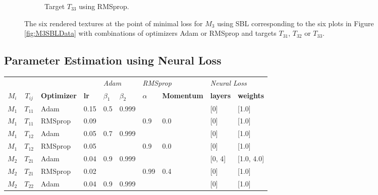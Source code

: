 \begin{figure}
\begin{subfigure}[t]{.25\textwidth}
    \caption{Target $T_{33}$ using RMSprop.}
    \label{fig:M3SBLFinalRendersRealLifeRMSprop}
\end{subfigure}
\caption{The six rendered textures at the point of minimal loss for $M_3$ using SBL corresponding to the six plots in Figure \ref{fig:M3SBLData} with combinations of optimizers Adam or RMSprop and targets $T_{31}$, $T_{32}$ or $T_{33}$.}
\label{fig:M3SBLFinalRenders}
\end{figure}

\newpage
\subsection{Parameter Estimation using Neural Loss}

\begin{table}
\centering
\begin{tabular}{ccllllllll}
\textbf{}      &                   & \textbf{}          & \multicolumn{1}{l|}{}            & \multicolumn{2}{l|}{\textit{Adam}}                           & \multicolumn{2}{l|}{\textit{RMSprop}}                      & \multicolumn{2}{l|}{\textit{Neural Loss}}               \\
\textbf{$M_i$} & \textbf{$T_{ij}$} & \textbf{Optimizer} & \multicolumn{1}{l|}{\textbf{lr}} & \textbf{$\beta_1$} & \multicolumn{1}{l|}{\textbf{$\beta_2$}} & \textbf{$\alpha$} & \multicolumn{1}{l|}{\textbf{Momentum}} & \textbf{layers} & \multicolumn{1}{l|}{\textbf{weights}} \\ \hline
 $M_1$     & $T_{11}$   & Adam       & 0.15       & 0.5        & 0.999      &            &            & [0]        & [1.0]      \\
 $M_1$     & $T_{11}$   & RMSprop    & 0.09       &            &            & 0.9        & 0.0        & [0]        & [1.0]      \\
 $M_1$     & $T_{12}$   & Adam       & 0.05       & 0.7        & 0.999      &            &            & [0]        & [1.0]      \\
 $M_1$     & $T_{12}$   & RMSprop    & 0.05       &            &            & 0.9        & 0.0        & [0]        & [1.0]      \\
  $M_2$     & $T_{21}$   & Adam       & 0.04       & 0.9        & 0.999      &            &            & [0, 4]     & [1.0, 4.0] \\
 $M_2$     & $T_{21}$   & RMSprop    & 0.02       &            &            & 0.99       & 0.4        & [0]        & [1.0]      \\
 $M_2$     & $T_{22}$   & Adam       & 0.04       & 0.9        & 0.999      &            &            & [0]        & [1.0]      \\

\end{tabular}
\end{table}
